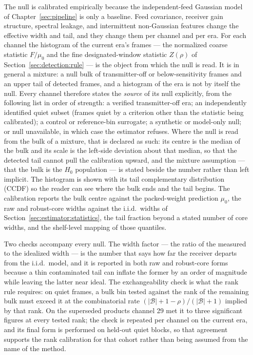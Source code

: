 The null is calibrated empirically because the independent-feed Gaussian
model of Chapter~\ref{sec:pipeline} is only a baseline.  Feed covariance,
receiver gain structure, spectral leakage, and intermittent non-Gaussian
features change the effective width and tail, and they change them per channel
and per era.  For each channel the histogram of the current era's frames --- the
normalized coarse statistic $F/\mu_0$ and the fine designated-window statistic
$Z(\rho)$ of Section~\ref{sec:detection:rule} --- is the object from which the
null is read.  It is in general a mixture: a null bulk of transmitter-off or
below-sensitivity frames and an upper tail of detected frames, and a histogram
of the era is not by itself the null.  Every channel therefore states the
\emph{source} of its null explicitly, from the following list in order of
strength: a verified transmitter-off era; an independently identified quiet
subset (frames quiet by a criterion other than the statistic being
calibrated); a control or reference-bin surrogate; a synthetic or model-only
null; or null unavailable, in which case the estimator refuses.  Where the
null is read from the bulk of a mixture, that is declared as such: its centre
is the median of the bulk and its scale is the left-side deviation about that
median, so that the detected tail cannot pull the calibration upward, and the
mixture assumption --- that the bulk is the $H_0$ population --- is stated
beside the number rather than left implicit.  The histogram is shown with its
tail complementary distribution (CCDF) so the reader can see where the bulk
ends and the tail begins.  The calibration
reports the bulk centre against the packed-weight prediction $\mu_0$, the raw
and robust-core widths against the i.i.d.\ widths of
Section~\ref{sec:estimator:statistics}, the tail fraction beyond a stated
number of core widths, and the shelf-level mapping of those quantiles.

Two checks accompany every null.  The width factor --- the ratio of the
measured to the idealized width --- is the number that says how far the
receiver departs from the i.i.d.\ model, and it is reported in both raw and
robust-core forms because a thin contaminated tail can inflate the former by an
order of magnitude while leaving the latter near ideal.  The exchangeability
check is what the rank rule requires: on quiet frames, a bulk bin tested
against the rank of the remaining bulk must exceed it at the combinatorial rate
$(|\mathcal B|+1-\rho)/(|\mathcal B|+1)$ implied by that rank.  On the
superseded products channel 29 met it to three significant figures at every
tested rank; the check is repeated per channel on the current era, and its
final form is performed on held-out quiet blocks, so that agreement supports
the rank calibration for that cohort rather than being assumed from the name of
the method.

